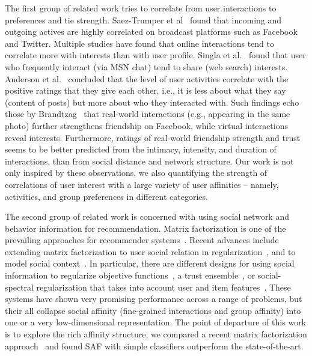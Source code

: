 The first group of related work tries to correlate from user interactions to preferences and tie strength. 
Saez-Trumper et al~\cite{saez2011high} found that incoming and outgoing actives are
highly correlated on broadcast platforms such as Facebook and Twitter.
Multiple studies  have found that online interactions
tend to correlate more with interests than with user profile. Singla et al.~\cite{singla2008yes} found that user who frequently interact (via MSN chat) tend to share (web search) interests. 
Anderson et al.~\cite{Anderson2012} concluded that the level of user activities correlate with the positive ratings that they give each other, i.e., it is less about what they say (content of posts) but more about who they interacted with. Such findings echo those by Brandtzag~\cite{brandtzag2011facebook}
that real-world interactions (e.g., appearing in the same photo) further strengthens friendship on Facebook, while virtual interactions reveal interests. Furthermore, ratings of real-world friendship strength and trust~\cite{gilbert2009predicting} seems to be better predicted from the intimacy, intensity, and duration of interactions, than from social distance and network structure. 
Our work is not only inspired by these observations, we also quantifying the strength of correlations 
of user interest with a large variety of user affinities -- namely, activities, and group preferences in different categories.

The second group of related work is concerned with using social network and behavior information for recommendation. 
Matrix factorization is one of the prevailing approaches for recommender systems~\cite{koren2009matrix}.
Recent advances include extending matrix factorization to user social relation in regularization~\cite{sr,rrmf}, 
and to model social context~\cite{Jiang2012SCR}. 
In particular, there are different designs for using social information to regularize objective functions~\cite{lla}, a trust
ensemble~\cite{ste}, 
or social-spectral regularization that takes into account user and item features~\cite{Noel2012NOF}. 
These systems have shown very promising performance across a range of problems, but their all collapse 
social affinity (fine-grained interactions and group affinity) into one or a very low-dimensional 
representation. The point of departure of this work is to explore the rich affinity structure, 
we compared a recent matrix factorization approach~\cite{Noel2012NOF} and found SAF with simple 
classifiers outperform the state-of-the-art.

